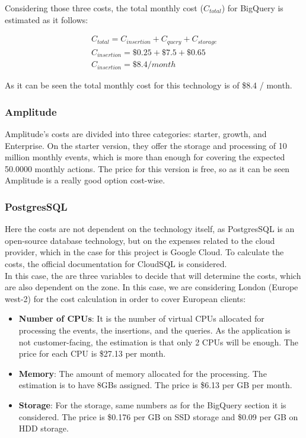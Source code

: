 \documentclass[english, 12pt, a4paper, sci, utf8, a-1b, online]{aaltothesis}
\begin{document}
Considering those three costs, the total monthly cost ($C_{total}$) for BigQuery is estimated as it follows:

\begin{equation}
\begin{split}
    C_{total} = C_{insertion} + C_{query} + C_{storage}\\
    C_{insertion} = \$0.25 + \$7.5 +\$0.65\\
    C_{insertion} = \$8.4 / month
\end{split}
\end{equation}

As it can be seen the total monthly cost for this technology is of \$8.4 / month.

\subsubsection*{Amplitude}

Amplitude's costs are divided into three categories: starter, growth, and Enterprise. On the starter version, they offer the storage and processing of 10 million monthly events, which is more than enough for covering the expected 50.0000 monthly actions. The price for this version is free, so as it can be seen Amplitude is a really good option cost-wise.

\subsubsection*{PostgresSQL}

Here the costs are not dependent on the technology itself, as PostgresSQL is an open-source database technology, but on the expenses related to the cloud provider, which in the case for this project is Google Cloud. To calculate the costs, the official documentation for CloudSQL \cite{PostgreSQLonGCP} is considered.\\

In this case, the are three variables to decide that will determine the costs, which are also dependent on the zone. In this case, we are considering London (Europe west-2) for the cost calculation in order to cover European clients:

\begin{itemize}
    \item \textbf{Number of CPUs}: It is the number of virtual CPUs allocated for processing the events, the insertions, and the queries. As the application is not customer-facing, the estimation is that only 2 CPUs will be enough. The price for each CPU is \$27.13 per month.
    \item \textbf{Memory}: The amount of memory allocated for the processing. The estimation is to have 8GBs assigned. The price is \$6.13 per GB per month.
    \item \textbf{Storage}: For the storage, same numbers as for the BigQuery section it is considered. The price is \$0.176 per GB on SSD storage and \$0.09 per GB on HDD storage.
\end{itemize}
\end{document}

